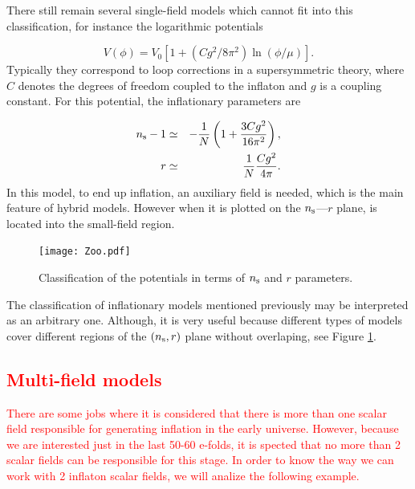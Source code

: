 \documentclass{rmaa}
\def\beq{\begin{equation}}
\def\eeq{\end{equation}}
\def\bea{\begin{eqnarray}}
\def\eea{\end{eqnarray}}
\begin{document}
There still remain several single-field models which cannot fit into this classification, 
for instance the logarithmic potentials \citep{Barrow2}

\beq
V\left(\phi\right) =V_0\left[1+(C g^2/8\pi^2)
\ln\left(\phi/\mu\right)\right].
\eeq
%
Typically they correspond to loop corrections in a supersymmetric theory,
where $C$ denotes the degrees of freedom coupled
to the inflaton and $g$ is a coupling constant.  
%
For this potential, the inflationary parameters are

\bea
n_{\rm s}-1&\simeq& -\frac{1}{N}\left(1+\frac{3C g^2}{16 \pi^2}\right), \nonumber \\
r&\simeq& \frac{1}{N}{Cg^2\over 4\pi}.
 \eea
%
In this model, to end up inflation, an auxiliary field is needed, which is the main feature of
hybrid models. However when it is plotted on the $n_{\rm s}$---$r$ plane, is located into the
small-field region.
\\

\begin{figure}[h!]
\begin{center}
  \texttt{[image: Zoo.pdf]}
	\caption{Classification of the
potentials in terms of $n_{\rm s}$ and $r$ parameters. }
\label{fig:parameters}
\end{center}
\end{figure}

The classification of inflationary models mentioned previously may be interpreted as an 
arbitrary one. Although, it is very useful because different types of models cover different 
regions of the $(n_{\rm s}, r)$ plane without overlaping, see Figure \ref{fig:parameters}.

\subsection{\textcolor{red}{Multi-field models}}

\textcolor{red}{There are some jobs where it is considered that there is more than one scalar field responsible for generating inflation in the early universe. However, because we are interested just in the last 50-60 e-folds, it is spected that no more than 2 scalar fields can be responsible for this stage. In order to know the way we can work with 2 inflaton scalar fields, we will analize the following example.}
\end{document}
